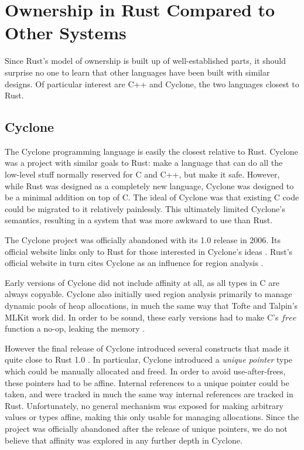 \chapter{Ownership in Rust Compared to Other Systems}
\label{ch:related}

Since Rust's model of ownership is built up of well-established parts, it should
surprise no one to learn that other languages have been built with similar
designs. Of particular interest are C++ and Cyclone, the two languages closest
to Rust.




\section{Cyclone}

The Cyclone programming language is easily the closest relative to Rust. Cyclone
was a project with similar goals to Rust: make a language that can do all the
low-level stuff normally reserved for C and C++, but make it safe. However, while
Rust was designed as a completely new language, Cyclone was designed to be a
minimal addition on top of C. The ideal of Cyclone was that existing C code
could be migrated to it relatively painlessly. This ultimately limited
Cyclone's semantics, resulting in a system that was more awkward to use than
Rust.

The Cyclone project was officially abandoned with its 1.0 release in 2006.
Its official website links only to Rust for those interested in Cyclone's ideas
\cite{cyclone-web}. Rust's official website in turn cites Cyclone as an
influence for region analysis \cite{rust-stolen}.

Early versions of Cyclone did not include affinity at all, as all types in C
are always copyable. Cyclone also initially used region analysis primarily to
manage dynamic pools of heap allocations, in much the same way that Tofte and Talpin's
MLKit work did. In order to be sound, these early versions had to make C's $free$ function
a no-op, leaking the memory \cite{grossman2002region}.

However the final release of Cyclone introduced several constructs
that made it quite close to Rust 1.0 \cite{swamy2006safe}. In particular, Cyclone introduced
a \emph{unique pointer} type which could be manually allocated and freed. In order
to avoid use-after-frees, these pointers had to be affine. Internal references to a
unique pointer could be taken, and were tracked in much the same way internal references are
tracked in Rust. Unfortunately, no general mechanism was exposed for making arbitrary
values or types affine, making this only usable for managing allocations.
Since the project was officially abandoned after the release of unique pointers, we
do not believe that affinity was explored in any further depth in Cyclone.






